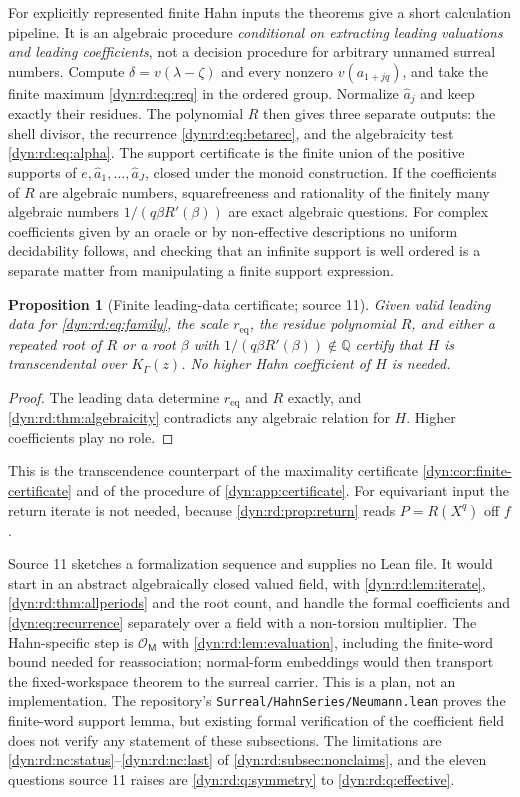 \documentclass[11pt,letterpaper]{article}
\newtheorem{proposition}[proposition]{Proposition}
\theoremstyle{definition}
\theoremstyle{remark}
\newcommand{\Q}{\mathbb Q}
\newcommand{\OO}{\mathcal O}
\numberwithin{equation}{section}
\begin{document}
For explicitly represented finite Hahn inputs the theorems give a short
calculation pipeline. It is an algebraic procedure \emph{conditional on
extracting leading valuations and leading coefficients}, not a decision
procedure for arbitrary unnamed surreal numbers. Compute
$\delta=v(\lambda-\zeta)$ and every nonzero $v(a_{1+jq})$, and take the
finite maximum \eqref{dyn:rd:eq:req} in the ordered group. Normalize
$\hat a_j$ and keep exactly their residues. The polynomial $R$ then gives
three separate outputs: the shell divisor, the recurrence
\eqref{dyn:rd:eq:betarec}, and the algebraicity test
\eqref{dyn:rd:eq:alpha}. The support certificate is the finite union of the
positive supports of $e,\hat a_1,\dots,\hat a_J$, closed under the monoid
construction. If the coefficients of $R$ are algebraic numbers,
squarefreeness and rationality of the finitely many algebraic numbers
$1/(q\beta R'(\beta))$ are exact algebraic questions. For complex
coefficients given by an oracle or by non-effective descriptions no uniform
decidability follows, and checking that an infinite support is well ordered
is a separate matter from manipulating a finite support expression.

\begin{proposition}[Finite leading-data certificate; source 11]
\label{dyn:rd:prop:certificate}
Given valid leading data for \eqref{dyn:rd:eq:family}, the scale
$r_{\mathrm{eq}}$, the residue polynomial $R$, and either a repeated root of
$R$ or a root $\beta$ with $1/(q\beta R'(\beta))\notin\Q$ certify that $H$
is transcendental over $K_\Gamma(z)$. No higher Hahn coefficient of $H$ is
needed.
\end{proposition}
\begin{proof}
The leading data determine $r_{\mathrm{eq}}$ and $R$ exactly, and
\cref{dyn:rd:thm:algebraicity} contradicts any algebraic relation for $H$.
Higher coefficients play no role.
\end{proof}

This is the transcendence counterpart of the maximality certificate
\cref{dyn:cor:finite-certificate} and of the procedure of
\cref{dyn:app:certificate}. For equivariant input the return iterate is not
needed, because \cref{dyn:rd:prop:return} reads $P=R(X^{q})$ off $f$.

Source 11 sketches a formalization sequence and supplies no Lean file. It
would start in an abstract algebraically closed valued field, with
\cref{dyn:rd:lem:iterate}, \cref{dyn:rd:thm:allperiods} and the root count,
and handle the formal coefficients and \eqref{dyn:eq:recurrence} separately
over a field with a non-torsion multiplier. The Hahn-specific step is
$\OO_{\mathsf M}$ with \cref{dyn:rd:lem:evaluation}, including the
finite-word bound needed for reassociation; normal-form embeddings would
then transport the fixed-workspace theorem to the surreal carrier. This is a
plan, not an implementation. The repository's
\texttt{Surreal/HahnSeries/Neumann.lean} proves the finite-word support
lemma, but existing formal verification of the coefficient field does not
verify any statement of these subsections. The limitations are
\ref{dyn:rd:nc:status}--\ref{dyn:rd:nc:last} of
\cref{dyn:rd:subsec:nonclaims}, and the eleven questions source 11 raises
are \cref{dyn:rd:q:symmetry} to \cref{dyn:rd:q:effective}.
\end{document}
